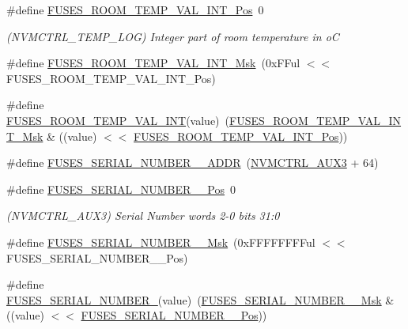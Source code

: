 \begin{DoxyCompactItemize}
\item 
\#define \mbox{\hyperlink{group__fuses__api_ga614f00b6390a26716abbcbbd6e7d7b7d}{F\+U\+S\+E\+S\+\_\+\+R\+O\+O\+M\+\_\+\+T\+E\+M\+P\+\_\+\+V\+A\+L\+\_\+\+I\+N\+T\+\_\+\+Pos}}~0
\begin{DoxyCompactList}\small\item\em (N\+V\+M\+C\+T\+R\+L\+\_\+\+T\+E\+M\+P\+\_\+\+L\+OG) Integer part of room temperature in oC \end{DoxyCompactList}\item 
\#define \mbox{\hyperlink{group__fuses__api_gad9cfc82c72b2f757ed5d93969b679f19}{F\+U\+S\+E\+S\+\_\+\+R\+O\+O\+M\+\_\+\+T\+E\+M\+P\+\_\+\+V\+A\+L\+\_\+\+I\+N\+T\+\_\+\+Msk}}~(0x\+F\+Ful $<$$<$ F\+U\+S\+E\+S\+\_\+\+R\+O\+O\+M\+\_\+\+T\+E\+M\+P\+\_\+\+V\+A\+L\+\_\+\+I\+N\+T\+\_\+\+Pos)
\item 
\#define \mbox{\hyperlink{group__fuses__api_gaca57712e9a2b15cb9e40facb54c0dacb}{F\+U\+S\+E\+S\+\_\+\+R\+O\+O\+M\+\_\+\+T\+E\+M\+P\+\_\+\+V\+A\+L\+\_\+\+I\+NT}}(value)~(\mbox{\hyperlink{group__fuses__api_gad9cfc82c72b2f757ed5d93969b679f19}{F\+U\+S\+E\+S\+\_\+\+R\+O\+O\+M\+\_\+\+T\+E\+M\+P\+\_\+\+V\+A\+L\+\_\+\+I\+N\+T\+\_\+\+Msk}} \& ((value) $<$$<$ \mbox{\hyperlink{group__fuses__api_ga614f00b6390a26716abbcbbd6e7d7b7d}{F\+U\+S\+E\+S\+\_\+\+R\+O\+O\+M\+\_\+\+T\+E\+M\+P\+\_\+\+V\+A\+L\+\_\+\+I\+N\+T\+\_\+\+Pos}}))
\item 
\#define \mbox{\hyperlink{group__fuses__api_ga83e27e287731bf5589202949b2aad7d4}{F\+U\+S\+E\+S\+\_\+\+S\+E\+R\+I\+A\+L\+\_\+\+N\+U\+M\+B\+E\+R\+\_\+\_\+\+A\+D\+DR}}~(\mbox{\hyperlink{group___s_a_m_d21_j16_b__base_ga478afec83ff525e3abb7dfb5ca699f18}{N\+V\+M\+C\+T\+R\+L\+\_\+\+A\+U\+X3}} + 64)
\item 
\#define \mbox{\hyperlink{group__fuses__api_gaaf29bf16a55932c9b371fb195a106c98}{F\+U\+S\+E\+S\+\_\+\+S\+E\+R\+I\+A\+L\+\_\+\+N\+U\+M\+B\+E\+R\+\_\+\_\+\+Pos}}~0
\begin{DoxyCompactList}\small\item\em (N\+V\+M\+C\+T\+R\+L\+\_\+\+A\+U\+X3) Serial Number words 2-\/0 bits 31\+:0 \end{DoxyCompactList}\item 
\#define \mbox{\hyperlink{group__fuses__api_gafe970a96d0393a205733d6391795f419}{F\+U\+S\+E\+S\+\_\+\+S\+E\+R\+I\+A\+L\+\_\+\+N\+U\+M\+B\+E\+R\+\_\+\_\+\+Msk}}~(0x\+F\+F\+F\+F\+F\+F\+F\+Ful $<$$<$ F\+U\+S\+E\+S\+\_\+\+S\+E\+R\+I\+A\+L\+\_\+\+N\+U\+M\+B\+E\+R\+\_\+\_\+\+Pos)
\item 
\#define \mbox{\hyperlink{group__fuses__api_ga4ea50e4ffb9b5b1a01f23de26ae43969}{F\+U\+S\+E\+S\+\_\+\+S\+E\+R\+I\+A\+L\+\_\+\+N\+U\+M\+B\+E\+R\+\_}}(value)~(\mbox{\hyperlink{group__fuses__api_gafe970a96d0393a205733d6391795f419}{F\+U\+S\+E\+S\+\_\+\+S\+E\+R\+I\+A\+L\+\_\+\+N\+U\+M\+B\+E\+R\+\_\+\_\+\+Msk}} \& ((value) $<$$<$ \mbox{\hyperlink{group__fuses__api_gaaf29bf16a55932c9b371fb195a106c98}{F\+U\+S\+E\+S\+\_\+\+S\+E\+R\+I\+A\+L\+\_\+\+N\+U\+M\+B\+E\+R\+\_\+\_\+\+Pos}}))

\end{DoxyCompactItemize}
